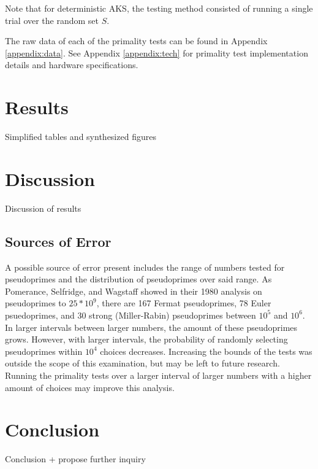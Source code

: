 \documentclass{article}
\begin{document}
Note that for deterministic AKS, the testing method consisted of running a single trial over the random set $S$.

The raw data of each of the primality tests can be found in Appendix \ref{appendix:data}.
See Appendix \ref{appendix:tech} for primality test implementation details and hardware specifications.

\section{Results}
Simplified tables and synthesized figures

\section{Discussion}
Discussion of results

\subsection{Sources of Error}
A possible source of error present includes the range of numbers tested for pseudoprimes and the distribution of pseudoprimes over said range. %
As Pomerance, Selfridge, and Wagstaff showed in their 1980 analysis on pseudoprimes to $25 * 10^9$, there are 167 Fermat pseudoprimes, 78 Euler psuedoprimes, and 30 strong (Miller-Rabin) pseudoprimes between $10^5$ and $10^6$. In larger intervals between larger numbers, the amount of these pseudoprimes grows. However, with larger intervals, the probability of randomly selecting pseudoprimes within $10^4$ choices decreases. Increasing the bounds of the tests was outside the scope of this examination, but may be left to future research. Running the primality tests over a larger interval of larger numbers with a higher amount of choices may improve this analysis. 

\section{Conclusion}
Conclusion + propose further inquiry

\nocite{*}


\end{document}
